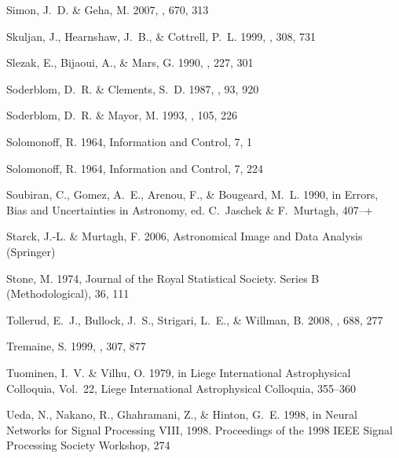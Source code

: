 \begin{thebibliography}{99}
{Simon}, J.~D. \& {Geha}, M. 2007, \apj, 670, 313

{Skuljan}, J., {Hearnshaw}, J.~B., \& {Cottrell}, P.~L. 1999, \mnras, 308, 731

{Slezak}, E., {Bijaoui}, A., \& {Mars}, G. 1990, \aap, 227, 301

{Soderblom}, D.~R. \& {Clements}, S.~D. 1987, \aj, 93, 920

{Soderblom}, D.~R. \& {Mayor}, M. 1993, \aj, 105, 226

{Solomonoff}, R. 1964{}, {Information and Control}, 7, 1

{Solomonoff}, R. 1964{}, {Information and Control}, 7, 224

{Soubiran}, C., {Gomez}, A.~E., {Arenou}, F., \& {Bougeard}, M.~L. 1990, in
  Errors, Bias and Uncertainties in Astronomy, ed. C.~{Jaschek} \&
  F.~{Murtagh}, 407--+

{Starck}, J.-L. \& {Murtagh}, F. 2006, {Astronomical Image and Data Analysis}
  ({Springer})

{Stone}, M. 1974, Journal of the Royal Statistical Society. Series B
  (Methodological), 36, 111

{Tollerud}, E.~J., {Bullock}, J.~S., {Strigari}, L.~E., \& {Willman}, B. 2008,
  \apj, 688, 277

{Tremaine}, S. 1999, \mnras, 307, 877

{Tuominen}, I.~V. \& {Vilhu}, O. 1979, in Liege International Astrophysical
  Colloquia, Vol.~22, Liege International Astrophysical Colloquia, 355--360

{Ueda}, N., {Nakano}, R., {Ghahramani}, Z., \& {Hinton}, G.~E. 1998, in {Neural
  Networks for Signal Processing VIII, 1998. Proceedings of the 1998 IEEE
  Signal Processing Society Workshop}, 274


\end{thebibliography}
